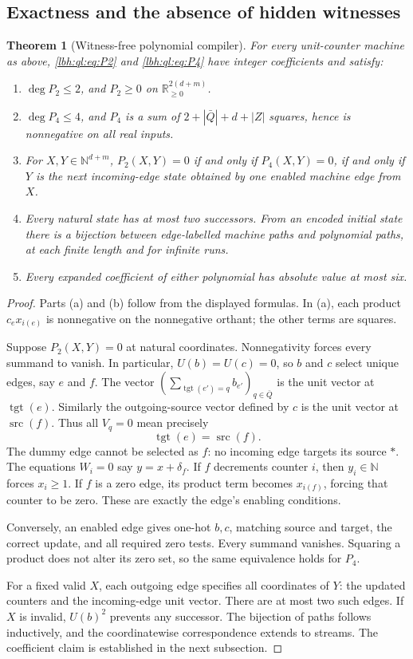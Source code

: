 \documentclass[11pt,letterpaper]{article}
\newtheorem{theorem}{Theorem}[section]
\theoremstyle{definition}
\theoremstyle{remark}
\newcommand{\N}{\mathbb N}
\newcommand{\R}{\mathbb R}
\newcommand{\src}{\operatorname{src}}
\newcommand{\tgt}{\operatorname{tgt}}
\newcommand{\1}{\mathbf 1}
\begin{document}
\subsection{Exactness and the absence of hidden witnesses}
\begin{theorem}[Witness-free polynomial compiler]\label{lbh:ql:thm:compiler}
For every unit-counter machine as above, \eqref{lbh:ql:eq:P2} and \eqref{lbh:ql:eq:P4} have
integer coefficients and satisfy:
\begin{enumerate}[label=(\alph*)]
\item $\deg P_2\leq2$, and $P_2\geq0$ on
$\R_{\geq0}^{2(d+m)}$.
\item $\deg P_4\leq4$, and $P_4$ is a sum of
$2+|\bar Q|+d+|Z|$ squares, hence is nonnegative on all real inputs.
\item For $X,Y\in\N^{d+m}$, $P_2(X,Y)=0$ if and only if
$P_4(X,Y)=0$, if and only if $Y$ is the next incoming-edge state obtained by
one enabled machine edge from $X$.
\item Every natural state has at most two successors. From an encoded initial
state there is a bijection between edge-labelled machine paths and polynomial
paths, at each finite length and for infinite runs.
\item Every expanded coefficient of either polynomial has absolute value at
most six.
\end{enumerate}
\end{theorem}
\begin{proof}
Parts (a) and (b) follow from the displayed formulas. In (a), each product
$c_e x_{i(e)}$ is nonnegative on the nonnegative orthant; the other terms are
squares.

Suppose $P_2(X,Y)=0$ at natural coordinates. Nonnegativity forces every
summand to vanish. In particular, $U(b)=U(c)=0$, so $b$ and $c$ select unique
edges, say $e$ and $f$. The vector
$(\sum_{\tgt(e')=q}b_{e'})_{q\in\bar Q}$ is the unit vector at $\tgt(e)$.
Similarly the outgoing-source vector defined by $c$ is the unit vector at
$\src(f)$. Thus all $V_q=0$ mean precisely
\[
 \tgt(e)=\src(f).
\]
The dummy edge cannot be selected as $f$: no incoming edge targets its source
$*$. The equations $W_i=0$ say $y=x+\delta_f$. If $f$ decrements counter $i$,
then $y_i\in\N$ forces $x_i\geq1$. If $f$ is a zero edge, its product term
becomes $x_{i(f)}$, forcing that counter to be zero. These are exactly the
edge's enabling conditions.

Conversely, an enabled edge gives one-hot $b,c$, matching source and target,
the correct update, and all required zero tests. Every summand vanishes.
Squaring a product does not alter its zero set, so the same equivalence holds
for $P_4$.

For a fixed valid $X$, each outgoing edge specifies all coordinates of $Y$:
the updated counters and the incoming-edge unit vector. There are at most two
such edges. If $X$ is invalid, $U(b)^2$ prevents any successor. The bijection
of paths follows inductively, and the coordinatewise correspondence extends
to streams. The coefficient claim is established in the next subsection.
\end{proof}
\end{document}
